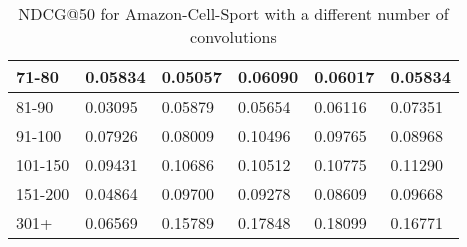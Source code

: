 \begin{table}[]
\begin{tabular}{|l|l|l|l|l|l|}
    71-80   & 0.05834                    & 0.05057                    & 0.06090                    & 0.06017                    & 0.05834                    \\ \hline
    81-90   & 0.03095                    & 0.05879                    & 0.05654                    & 0.06116                    & 0.07351                    \\ \hline
    91-100  & 0.07926                    & 0.08009                    & 0.10496                    & 0.09765                    & 0.08968                    \\ \hline
    101-150 & 0.09431                    & 0.10686                    & 0.10512                    & 0.10775                    & 0.11290                    \\ \hline
    151-200 & 0.04864                    & 0.09700                    & 0.09278                    & 0.08609                    & 0.09668                    \\ \hline
    301+    & 0.06569                    & 0.15789                    & 0.17848                    & 0.18099                    & 0.16771                    \\ \hline
    \end{tabular}
    \caption{NDCG@50 for Amazon-Cell-Sport with a different number of convolutions}
    \label{tab:Amazon-cell-sport-con-evaluation}
    \end{table}